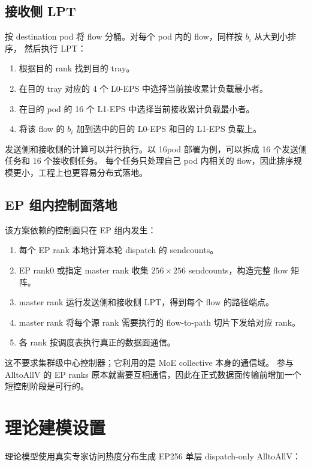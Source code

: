 \documentclass[UTF8,a4paper,11pt,fontset=none]{ctexart}
\begin{document}
\subsection{接收侧 LPT}

按 destination pod 将 flow 分桶。对每个 pod 内的 flow，同样按 $b_i$ 从大到小排序，
然后执行 LPT：

\begin{enumerate}
  \item 根据目的 rank 找到目的 tray。
  \item 在目的 tray 对应的 4 个 L0-EPS 中选择当前接收累计负载最小者。
  \item 在目的 pod 的 16 个 L1-EPS 中选择当前接收累计负载最小者。
  \item 将该 flow 的 $b_i$ 加到选中的目的 L0-EPS 和目的 L1-EPS 负载上。
\end{enumerate}

发送侧和接收侧的计算可以并行执行。以 16pod 部署为例，可以拆成 16 个发送侧任务和 16 个接收侧任务。
每个任务只处理自己 pod 内相关的 flow，因此排序规模更小，工程上也更容易分布式落地。

\subsection{EP 组内控制面落地}

该方案依赖的控制面只在 EP 组内发生：

\begin{enumerate}
  \item 每个 EP rank 本地计算本轮 dispatch 的 sendcounts。
  \item EP rank0 或指定 master rank 收集 $256\times256$ sendcounts，构造完整 flow 矩阵。
  \item master rank 运行发送侧和接收侧 LPT，得到每个 flow 的路径端点。
  \item master rank 将每个源 rank 需要执行的 flow-to-path 切片下发给对应 rank。
  \item 各 rank 按调度表执行真正的数据面通信。
\end{enumerate}

这不要求集群级中心控制器；它利用的是 MoE collective 本身的通信域。
参与 AlltoAllV 的 EP ranks 原本就需要互相通信，因此在正式数据面传输前增加一个短控制阶段是可行的。

\section{理论建模设置}

理论模型使用真实专家访问热度分布生成 EP256 单层 dispatch-only AlltoAllV：
\end{document}
